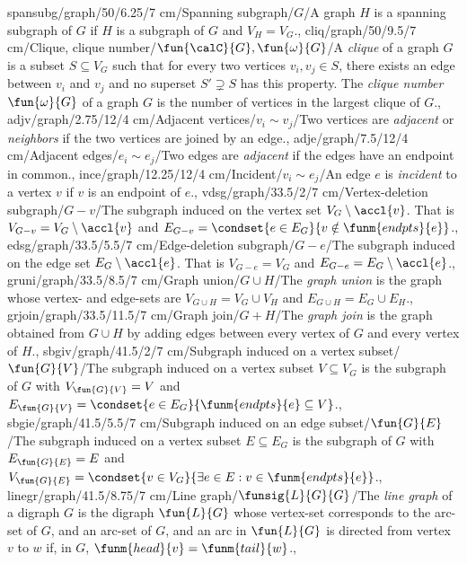 spansubg/graph/50/6.25/7 cm/{Spanning subgraph}/{\spanning{}$ G$}/{A graph $H$ is a spanning subgraph of $G$ if $H$ is a subgraph of $G$ and $V_H=V_G$.},
cliq/graph/50/9.5/7 cm/{Clique, clique number}/{$\fun{\calC}{G}, \fun{\omega}{G}$}/{A \emph{clique} of a graph $G$ is a subset $S\subseteq V_G$ such that for every two vertices $v_i,v_j\in S$, there exists an edge between $v_i$ and $v_j$ and no superset $S'\supsetneq S$ has this property. The \emph{clique number} $\fun{\omega}{G}$ of a graph $G$ is the number of vertices in the largest clique of $G$.},
adjv/graph/2.75/12/4 cm/{Adjacent vertices}/{$v_i\sim v_j$}/{Two vertices are \emph{adjacent} or \emph{neighbors} if the two vertices are joined by an edge.},
adje/graph/7.5/12/4 cm/{Adjacent edges}/{$e_i\sim e_j$}/{Two edges are \emph{adjacent} if the edges have an endpoint in common.},
ince/graph/12.25/12/4 cm/{Incident}/{$v_i\sim e_j$}/{An edge $e$ is \emph{incident} to a vertex $v$ if $v$ is an endpoint of $e$.},
vdsg/graph/33.5/2/7 cm/{Vertex-deletion subgraph}/{$G-v$}/{The subgraph induced on the vertex set $V_G\setminus\accl{v}$. That is $V_{G-v}=V_G\setminus\accl{v}$ and $E_{G-v}=\condset{e\in E_G}{v\notin\funm{endpts}{e}}$.},%
edsg/graph/33.5/5.5/7 cm/{Edge-deletion subgraph}/{$G-e$}/{The subgraph induced on the edge set $E_G\setminus\accl{e}$. That is $V_{G-e}=V_G$ and $E_{G-e}=E_G\setminus\accl{e}$.},%
gruni/graph/33.5/8.5/7 cm/{Graph union}/{$G\cup H$}/{The \emph{graph union} is the graph whose vertex- and edge-sets are $V_{G\cup H}=V_G\cup V_H$ and $E_{G\cup H}=E_G\cup E_H$.},%
grjoin/graph/33.5/11.5/7 cm/{Graph join}/{$G+H$}/{The \emph{graph join} is the graph obtained from $G\cup H$ by adding edges between every vertex of $G$ and every vertex of $H$.},%
sbgiv/graph/41.5/2/7 cm/{Subgraph induced on a vertex subset}/{$\fun{G}{V}$}/{The subgraph induced on a vertex subset $V\subseteq V_G$ is the subgraph of $G$ with $V_{\fun{G}{V}}=V$ and $E_{\fun{G}{V}}=\condset{e\in E_G}{\funm{endpts}{e}\subseteq V}$.},
sbgie/graph/41.5/5.5/7 cm/{Subgraph induced on an edge subset}/{$\fun{G}{E}$}/{The subgraph induced on a vertex subset $E\subseteq E_G$ is the subgraph of $G$ with $E_{\fun{G}{E}}=E$ and $V_{\fun{G}{E}}=\condset{v\in V_G}{\exists e\in E:v\in\funm{endpts}{e}}$.},
linegr/graph/41.5/8.75/7 cm/{Line graph}/{$\funsig{L}{G}{G}$}/{The \emph{line graph} of a digraph $G$ is the digraph $\fun{L}{G}$ whose vertex-set corresponds to the arc-set of $G$, and an arc-set of $G$, and an arc in $\fun{L}{G}$ is directed from vertex $v$ to $w$ if, in $G$, $\funm{head}{v}=\funm{tail}{w}$.},%
